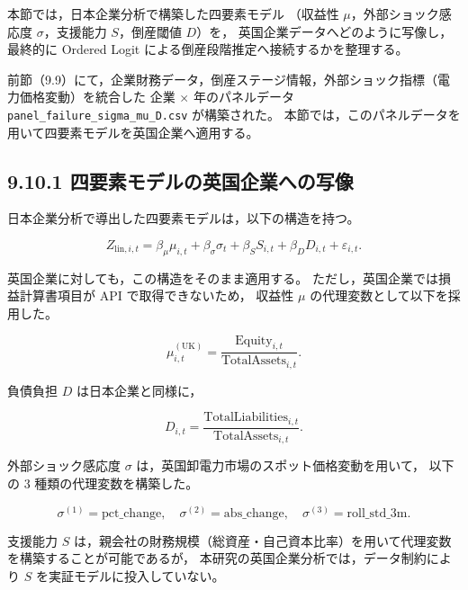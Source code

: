 本節では，日本企業分析で構築した四要素モデル
（収益性 $\mu$，外部ショック感応度 $\sigma$，支援能力 $S$，倒産閾値 $D$）を，
英国企業データへどのように写像し，最終的に Ordered Logit による倒産段階推定へ接続するかを整理する。

前節（9.9）にて，企業財務データ，倒産ステージ情報，外部ショック指標（電力価格変動）を統合した
企業 $\times$ 年のパネルデータ \texttt{panel\_failure\_sigma\_mu\_D.csv} が構築された。
本節では，このパネルデータを用いて四要素モデルを英国企業へ適用する。


\subsection*{9.10.1 四要素モデルの英国企業への写像}

日本企業分析で導出した四要素モデルは，以下の構造を持つ。



\[
Z_{\text{lin},i,t}
= \beta_\mu \mu_{i,t}
+ \beta_\sigma \sigma_{t}
+ \beta_S S_{i,t}
+ \beta_D D_{i,t}
+ \varepsilon_{i,t}.
\]



英国企業に対しても，この構造をそのまま適用する。
ただし，英国企業では損益計算書項目が API で取得できないため，
収益性 $\mu$ の代理変数として以下を採用した。



\[
\mu_{i,t}^{(\text{UK})}
= \frac{\text{Equity}_{i,t}}{\text{TotalAssets}_{i,t}}.
\]



負債負担 $D$ は日本企業と同様に，



\[
D_{i,t}
= \frac{\text{TotalLiabilities}_{i,t}}{\text{TotalAssets}_{i,t}}.
\]



外部ショック感応度 $\sigma$ は，英国卸電力市場のスポット価格変動を用いて，
以下の 3 種類の代理変数を構築した。



\[
\sigma^{(1)} = \text{pct\_change},\quad
\sigma^{(2)} = \text{abs\_change},\quad
\sigma^{(3)} = \text{roll\_std\_3m}.
\]



支援能力 $S$ は，親会社の財務規模（総資産・自己資本比率）を用いて代理変数を構築することが可能であるが，
本研究の英国企業分析では，データ制約により $S$ を実証モデルに投入していない。

